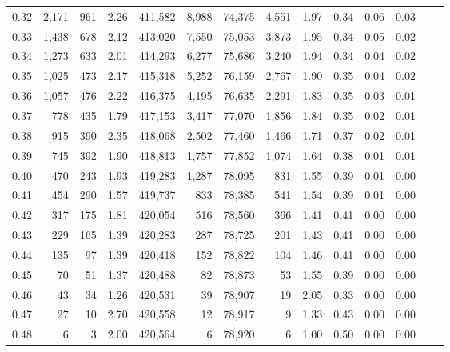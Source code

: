 \begin{tabular}{rrrrrrrrrrrrrr}
0.32 &   2,171 &    961 &    2.26 &  411,582 &    8,988 &  74,375 &   4,551 &  1.97 &  0.34 &  0.06 &      0.03 \\
0.33 &   1,438 &    678 &    2.12 &  413,020 &    7,550 &  75,053 &   3,873 &  1.95 &  0.34 &  0.05 &      0.02 \\
0.34 &   1,273 &    633 &    2.01 &  414,293 &    6,277 &  75,686 &   3,240 &  1.94 &  0.34 &  0.04 &      0.02 \\
0.35 &   1,025 &    473 &    2.17 &  415,318 &    5,252 &  76,159 &   2,767 &  1.90 &  0.35 &  0.04 &      0.02 \\
0.36 &   1,057 &    476 &    2.22 &  416,375 &    4,195 &  76,635 &   2,291 &  1.83 &  0.35 &  0.03 &      0.01 \\
0.37 &     778 &    435 &    1.79 &  417,153 &    3,417 &  77,070 &   1,856 &  1.84 &  0.35 &  0.02 &      0.01 \\
0.38 &     915 &    390 &    2.35 &  418,068 &    2,502 &  77,460 &   1,466 &  1.71 &  0.37 &  0.02 &      0.01 \\
0.39 &     745 &    392 &    1.90 &  418,813 &    1,757 &  77,852 &   1,074 &  1.64 &  0.38 &  0.01 &      0.01 \\
0.40 &     470 &    243 &    1.93 &  419,283 &    1,287 &  78,095 &     831 &  1.55 &  0.39 &  0.01 &      0.00 \\
0.41 &     454 &    290 &    1.57 &  419,737 &      833 &  78,385 &     541 &  1.54 &  0.39 &  0.01 &      0.00 \\
0.42 &     317 &    175 &    1.81 &  420,054 &      516 &  78,560 &     366 &  1.41 &  0.41 &  0.00 &      0.00 \\
0.43 &     229 &    165 &    1.39 &  420,283 &      287 &  78,725 &     201 &  1.43 &  0.41 &  0.00 &      0.00 \\
0.44 &     135 &     97 &    1.39 &  420,418 &      152 &  78,822 &     104 &  1.46 &  0.41 &  0.00 &      0.00 \\
0.45 &      70 &     51 &    1.37 &  420,488 &       82 &  78,873 &      53 &  1.55 &  0.39 &  0.00 &      0.00 \\
0.46 &      43 &     34 &    1.26 &  420,531 &       39 &  78,907 &      19 &  2.05 &  0.33 &  0.00 &      0.00 \\
0.47 &      27 &     10 &    2.70 &  420,558 &       12 &  78,917 &       9 &  1.33 &  0.43 &  0.00 &      0.00 \\
0.48 &       6 &      3 &    2.00 &  420,564 &        6 &  78,920 &       6 &  1.00 &  0.50 &  0.00 &      0.00 \\

\end{tabular}
